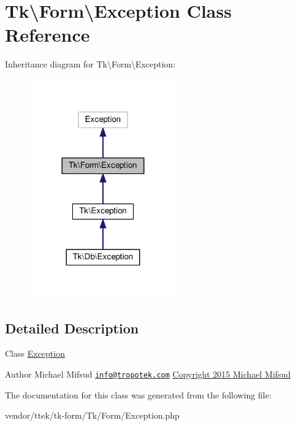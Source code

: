 \hypertarget{classTk_1_1Form_1_1Exception}{\section{Tk\textbackslash{}Form\textbackslash{}Exception Class Reference}
\label{classTk_1_1Form_1_1Exception}
}


Inheritance diagram for Tk\textbackslash{}Form\textbackslash{}Exception\+:\nopagebreak
\begin{figure}[H]
\begin{center}
\leavevmode
\includegraphics[width=180pt]{classTk_1_1Form_1_1Exception__inherit__graph}
\end{center}
\end{figure}


\subsection{Detailed Description}
Class \hyperlink{classTk_1_1Form_1_1Exception}{Exception}

\begin{DoxyAuthor}{Author}
Michael Mifsud \href{mailto:info@tropotek.com}{\tt info@tropotek.\+com} \hyperlink{}{Copyright 2015 Michael Mifsud }
\end{DoxyAuthor}


The documentation for this class was generated from the following file\+:\begin{DoxyCompactItemize}
\item 
vendor/ttek/tk-\/form/\+Tk/\+Form/Exception.\+php\end{DoxyCompactItemize}
